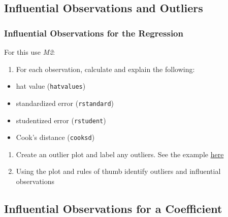 \documentclass[]{article}
\providecommand{\tightlist}{%
  \setlength{\itemsep}{0pt}\setlength{\parskip}{0pt}}
\begin{document}
\subsection{Influential Observations and
Outliers}\label{influential-observations-and-outliers}

\subsubsection{Influential Observations for the
Regression}\label{influential-observations-for-the-regression}

For this use \emph{M2}:

\begin{enumerate}
\def\labelenumi{\arabic{enumi}.}
\tightlist
\item
  For each observation, calculate and explain the following:
\end{enumerate}

\begin{itemize}
\tightlist
\item
  hat value (\texttt{hatvalues})
\item
  standardized error (\texttt{rstandard})
\item
  studentized error (\texttt{rstudent})
\item
  Cook's distance (\texttt{cooksd})
\end{itemize}

\begin{enumerate}
\def\labelenumi{\arabic{enumi}.}
\setcounter{enumi}{1}
\tightlist
\item
  Create an outlier plot and label any outliers. See the example
  \href{https://jrnold.github.io/intro-methods-notes/outliers.html\#iver-and-soskice-data}{here}
\item
  Using the plot and rules of thumb identify outliers and influential
  observations
\end{enumerate}

\subsection{Influential Observations for a
Coefficient}\label{influential-observations-for-a-coefficient}
\end{document}

